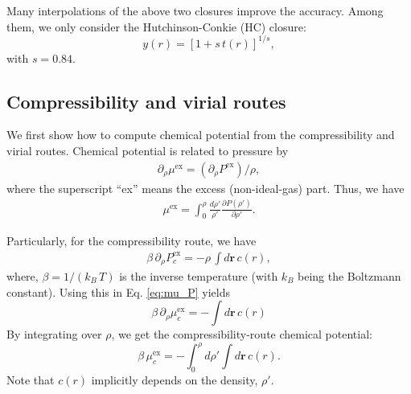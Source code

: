\documentclass[aip,jcp,reprint,superscriptaddress]{revtex4-1}
\newcommand{\vct}[1]{\mathbf{#1}}
\providecommand{\vr}{} %
\renewcommand{\vr}{\vct{r}}
\begin{document}
Many interpolations of the above two closures
improve the accuracy.
%
Among them, we only consider
the Hutchinson-Conkie (HC) closure\cite{hutchinson1971}:
%
\begin{equation}
y(r) = \left[1 + s \, t(r)\right]^{1/s},
\label{eq:HC}
\end{equation}
with $s = 0.84$.





\subsection{
\label{sec:cvroutes}
Compressibility and virial routes}




We first show
how to compute chemical potential
from the compressibility and virial routes.
%
Chemical potential is related to pressure by
%
\begin{align}
\partial_\rho \mu^\mathrm{ex}
=
(\partial_\rho P^\mathrm{ex}) / \rho,
\label{eq:mu_P}
\end{align}
%
where the superscript ``ex''
means the excess (non-ideal-gas) part.
%
Thus,
we have
%
\begin{align}
\mu^\mathrm{ex}
=
\int_0^\rho
  \frac{ d\rho' }{ \rho' }
  \frac{ \partial P(\rho') }{ \partial \rho' }.
\label{eq:mu_intrho}
\end{align}
%



Particularly,
for the compressibility route,
we have
%
\begin{align}
\beta \, \partial_\rho P_c^\mathrm{ex}
=
-\rho \, \int d\vr \, c(r),
\label{eq:dP_c}
\end{align}
%
where,
$\beta = 1/(k_B \, T)$
is the inverse temperature
(with $k_B$ being the Boltzmann constant).
%
Using this in Eq. \eqref{eq:mu_P}
yields
%
\begin{equation}
\beta \, \partial_\rho \mu_c^\mathrm{ex}
=
-\int d\vr \, c(r)
\label{eq:dmu_c}
\end{equation}
%
By integrating over $\rho$,
we get the compressibility-route chemical potential:
%
\begin{equation}
\beta \, \mu_c^\mathrm{ex}
=
-\int_0^\rho d \rho' \int d\vr \, c(r).
\label{eq:mu_c}
\end{equation}
%
Note that $c(r)$ implicitly depends on the density, $\rho'$.
\end{document}
